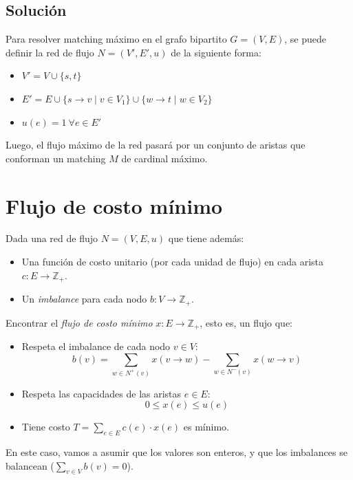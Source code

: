 \documentclass[a4paper]{report}
\newcommand{\Z}{\mathbb{Z}}
\begin{document}
\subsection{Solución}

Para resolver matching máximo en el grafo bipartito $G = (V, E)$, se puede definir la red de flujo $N =(V', E', u)$ de la siguiente forma:
\begin{itemize}
    \item $V' = V \cup \{s, t\}$
    \item $E' = E \cup \{s \rightarrow v \mid v \in V_1\} \cup \{w \rightarrow t \mid w \in V_2\}$
    \item $u(e) = 1\ \forall e \in E'$
\end{itemize}

Luego, el flujo máximo de la red pasará por un conjunto de aristas que conforman un matching $M$ de cardinal máximo.


\section{Flujo de costo mínimo}

\begin{problema}
    Dada una red de flujo $N = (V, E, u)$ que tiene además:
    \begin{itemize}
        \item Una función de costo unitario (por cada unidad de flujo) en cada arista $c: E \rightarrow \Z_+$.
        \item Un \textit{imbalance} para cada nodo $b: V \rightarrow \Z_+$.
    \end{itemize}

    Encontrar el \textit{flujo de costo mínimo} $x: E \rightarrow \Z_+$, esto es, un flujo que:
    \begin{itemize}
        \item Respeta el imbalance de cada nodo $v \in V$:
              $$b(v) = \sum_{w \in N^+(v)} x(v \rightarrow w) - \sum_{w \in N^-(v)} x(w \rightarrow v)$$
        \item Respeta las capacidades de las aristas $e \in E$:
              $$0 \leq x(e) \leq u(e)$$
        \item Tiene costo $T = \sum_{e \in E} c(e) \cdot x(e)$ es mínimo.
    \end{itemize}
\end{problema}

En este caso, vamos a asumir que los valores son enteros, y que los imbalances se balancean ($\sum_{v \in V} b(v) = 0$).
\end{document}
